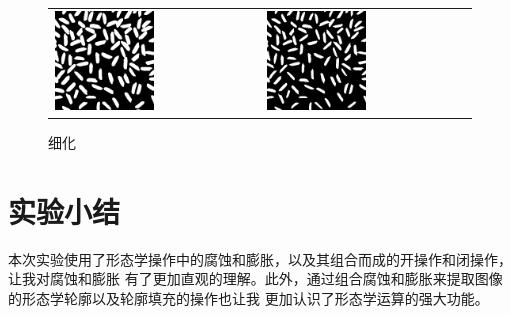 \documentclass[a4paper]{ctexart}
\begin{document}
\begin{figure}[H]
    \begin{tabular}{p{}p{}}
    \centering
      \includegraphics*[width=0.5\textwidth]{fig/dlt.png}
      \caption{粗化}
      &
      \centering
      \includegraphics*[width=0.5\textwidth]{fig/erd.png}
      \caption{细化}
    \end{tabular}
  \end{figure}

  \section{实验小结}
  本次实验使用了形态学操作中的腐蚀和膨胀，以及其组合而成的开操作和闭操作，让我对腐蚀和膨胀
  有了更加直观的理解。此外，通过组合腐蚀和膨胀来提取图像的形态学轮廓以及轮廓填充的操作也让我
  更加认识了形态学运算的强大功能。
\end{document}
